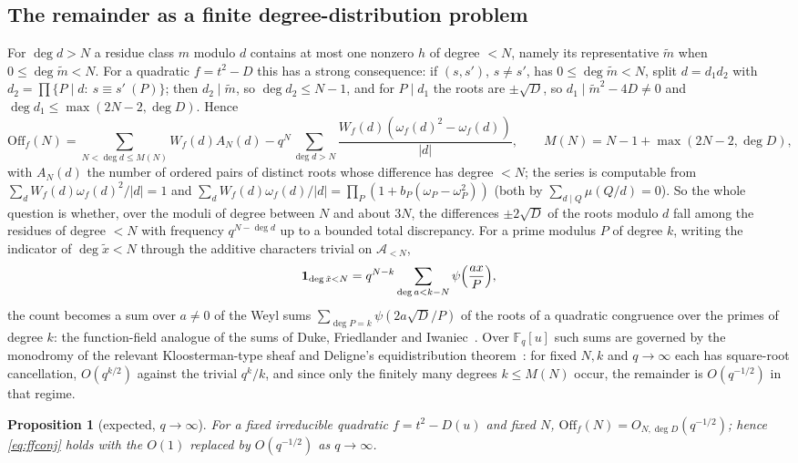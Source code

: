 \documentclass[11pt,a4paper]{article}
\newtheorem{proposition}[theorem]{Proposition}
\newcommand{\F}{\mathbb{F}}
\newcommand{\A}{\mathcal A}
\begin{document}
\subsection{The remainder as a finite degree-distribution problem}

For $\deg d>N$ a residue class $m$ modulo $d$ contains at most one nonzero $h$ of degree $<N$, namely its
representative $\tilde m$ when $0\le\deg\tilde m<N$. For a quadratic $f=t^2-D$ this has a strong
consequence: if $(s,s')$, $s\ne s'$, has $0\le\deg\tilde m<N$, split $d=d_1d_2$ with
$d_2=\prod\{P\mid d:\ s\equiv s'\ (P)\}$; then $d_2\mid\tilde m$, so $\deg d_2\le N-1$, and for $P\mid d_1$
the roots are $\pm\sqrt D$, so $d_1\mid\tilde m^2-4D\ne0$ and $\deg d_1\le\max(2N-2,\deg D)$. Hence
\[
\mathrm{Off}_f(N)=\sum_{N<\deg d\le M(N)}W_f(d)A_N(d)-q^N\sum_{\deg d>N}\frac{W_f(d)(\omega_f(d)^2-\omega_f(d))}{|d|},
\qquad M(N)=N-1+\max(2N-2,\deg D),
\]
with $A_N(d)$ the number of ordered pairs of distinct roots whose difference has degree $<N$; the series
is computable from $\sum_dW_f(d)\omega_f(d)^2/|d|=1$ and $\sum_dW_f(d)\omega_f(d)/|d|=\prod_P(1+b_P(\omega_P-\omega_P^2))$
(both by $\sum_{d\mid Q}\mu(Q/d)=0$). So the whole question is whether, over the moduli of degree between
$N$ and about $3N$, the differences $\pm2\sqrt D$ of the roots modulo $d$ fall among the residues of degree
$<N$ with frequency $q^{N-\deg d}$ up to a bounded total discrepancy. For a prime modulus $P$ of degree
$k$, writing the indicator of $\deg\tilde x<N$ through the additive characters trivial on $\A_{<N}$,
\[
\mathbf 1_{\deg\tilde x<N}=q^{N-k}\sum_{\deg a<k-N}\psi\Bigl(\frac{ax}{P}\Bigr),
\]
the count becomes a sum over $a\ne0$ of the Weyl sums $\sum_{\deg P=k}\psi(2a\sqrt D/P)$ of the roots of a
quadratic congruence over the primes of degree $k$: the function-field analogue of the sums of Duke,
Friedlander and Iwaniec~\cite{DFI1995}. Over $\F_q[u]$ such sums are governed by the monodromy of the
relevant Kloosterman-type sheaf and Deligne's equidistribution theorem~\cite{Katz1988}: for fixed $N,k$
and $q\to\infty$ each has square-root cancellation, $O(q^{k/2})$ against the trivial $q^k/k$, and since
only the finitely many degrees $k\le M(N)$ occur, the remainder is $O(q^{-1/2})$ in that regime.

\begin{proposition}[expected, $q\to\infty$]\label{prop:B3}
For a fixed irreducible quadratic $f=t^2-D(u)$ and fixed $N$, $\mathrm{Off}_f(N)=O_{N,\deg D}(q^{-1/2})$;
hence \eqref{eq:ffconj} holds with the $O(1)$ replaced by $O(q^{-1/2})$ as $q\to\infty$.
\end{proposition}
\end{document}
